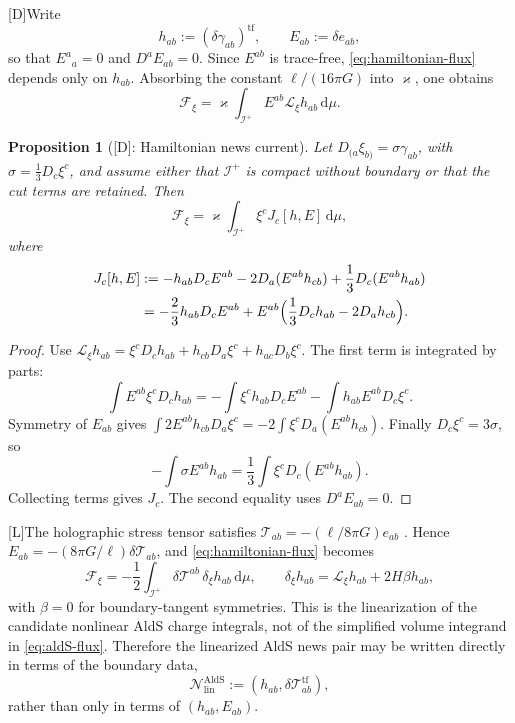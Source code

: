 \documentclass[11pt,a4paper]{article}
\newtheorem{proposition}[theorem]{Proposition}
\newcommand{\cT}{\mathcal{T}}
\newcommand{\cN}{\mathcal{N}}
\newcommand{\diff}{\mathrm{d}}
\newcommand{\statusL}{\textsf{[L]}}
\newcommand{\statusD}{\textsf{[D]}}
\begin{document}
\statusD Write
\begin{equation}
  h_{ab}:=(\delta\gamma_{ab})^{\mathrm{tf}},
  \qquad
  E_{ab}:=\delta e_{ab},
\end{equation}
so that \(E^a{}_a=0\) and \(D^aE_{ab}=0\).  Since \(E^{ab}\) is trace-free, \eqref{eq:hamiltonian-flux} depends only on \(h_{ab}\).  Absorbing the constant \(\ell/(16\pi G)\) into \(\varkappa\), one obtains
\begin{equation}
  \mathcal F_\xi=\varkappa\int_{\mathscr I^+}E^{ab}\mathcal L_\xi h_{ab}\,\diff\mu .
\end{equation}
\begin{proposition}[\statusD: Hamiltonian news current]
Let \(D_{(a}\xi_{b)}=\sigma\gamma_{ab}\), with \(\sigma=\frac13D_c\xi^c\), and assume either that \(\mathscr I^+\) is compact without boundary or that the cut terms are retained.  Then
\begin{equation}\label{eq:hamiltonian-news-current}
  \mathcal F_\xi=\varkappa\int_{\mathscr I^+}\xi^c J_c[h,E]\,\diff\mu ,
\end{equation}
where
\begin{align}
  J_c[h,E]
  &:=
  -h_{ab}D_cE^{ab}
  -2D_a(E^{ab}h_{cb})
  +\frac13D_c(E^{ab}h_{ab}) \notag\\
  &=
  -\frac23 h_{ab}D_cE^{ab}
  +
  E^{ab}\Big(\frac13D_ch_{ab}-2D_ah_{cb}\Big) .
\end{align}
\end{proposition}
\begin{proof}
Use
\(\mathcal L_\xi h_{ab}=\xi^cD_ch_{ab}+h_{cb}D_a\xi^c+h_{ac}D_b\xi^c\).  The first term is integrated by parts:
\[
  \int E^{ab}\xi^cD_ch_{ab}
  =
  -\int \xi^ch_{ab}D_cE^{ab}
  -\int h_{ab}E^{ab}D_c\xi^c .
\]
Symmetry of \(E_{ab}\) gives \(\int 2E^{ab}h_{cb}D_a\xi^c=-2\int\xi^cD_a(E^{ab}h_{cb})\).  Finally \(D_c\xi^c=3\sigma\), so
\[
  -\int \sigma E^{ab}h_{ab}
  =
  \frac13\int\xi^cD_c(E^{ab}h_{ab}) .
\]
Collecting terms gives \(J_c\).  The second equality uses \(D^aE_{ab}=0\).
\end{proof}

\statusL The holographic stress tensor satisfies \(\cT_{ab}=-(\ell/8\pi G)e_{ab}\) \cite{hoque2025conformal}.  Hence \(E_{ab}=-(8\pi G/\ell)\delta\cT_{ab}\), and \eqref{eq:hamiltonian-flux} becomes
\begin{equation}\label{eq:aldS-stress-flux-linear}
  \mathcal F_\xi
  =
  -\frac12
  \int_{\mathscr I^+}
  \delta\cT^{ab}\,\delta_\xi h_{ab}\,\diff\mu ,
  \qquad
  \delta_\xi h_{ab}=\mathcal L_\xi h_{ab}+2H\beta h_{ab},
\end{equation}
with \(\beta=0\) for boundary-tangent symmetries.  This is the linearization of the candidate nonlinear AldS charge integrals, not of the simplified volume integrand in \eqref{eq:aldS-flux}.  Therefore the linearized AldS news pair may be written directly in terms of the boundary data,
\begin{equation}
  \cN^{\mathrm{AldS}}_{\mathrm{lin}}
  :=
  (h_{ab},\delta\cT^{\mathrm{tf}}_{ab}) ,
\end{equation}
rather than only in terms of \((h_{ab},E_{ab})\).
\end{document}
